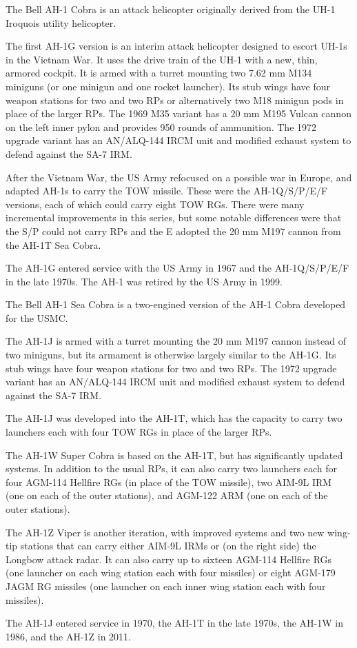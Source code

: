 

The Bell AH-1 Cobra is an attack helicopter originally derived from the UH-1 Iroquois utility helicopter.

The first AH-1G version is an interim attack helicopter designed to escort UH-1s in the Vietnam War. It uses the drive train of the UH-1 with a new, thin, armored cockpit. It is armed with a turret mounting two 7.62 mm M134 miniguns (or one minigun and one rocket launcher). Its stub wings have four weapon stations for two  and two  RPs or alternatively two M18 minigun pods in place of the larger RPs. The 1969 M35 variant has a 20 mm M195 Vulcan cannon on the left inner pylon and provides 950 rounds of ammunition. The 1972 upgrade variant has an AN/ALQ-144 IRCM unit and modified exhaust system to defend against the SA-7 IRM.

After the Vietnam War, the US Army refocused on a possible war in Europe, and adapted AH-1s to carry the TOW missile. These were the AH-1Q/S/P/E/F versions, each of which could carry eight TOW RGs. There were many incremental improvements in this series, but some notable differences were that the S/P could not carry RPs and the E adopted the 20 mm M197 cannon from the AH-1T Sea Cobra.

The AH-1G entered service with the US Army in 1967 and the AH-1Q/S/P/E/F in the late 1970s. The AH-1 was retired by the US Army in 1999.


The Bell AH-1 Sea Cobra is a two-engined version of the AH-1 Cobra developed for the USMC.

The AH-1J is armed with a turret mounting the 20 mm M197 cannon instead of two miniguns, but its armament is otherwise largely similar to the AH-1G. Its stub wings have four weapon stations for two  and two  RPs. The 1972 upgrade variant has an AN/ALQ-144 IRCM unit and modified exhaust system to defend against the SA-7 IRM.

The AH-1J was developed into the AH-1T, which has the capacity to carry two launchers each with four TOW RGs in place of the larger RPs.

The AH-1W Super Cobra is based on the AH-1T, but has significantly updated systems. In addition to the usual RPs, it can also carry two launchers each for four AGM-114 Hellfire RGs (in place of the TOW missile), two AIM-9L IRM (one on each of the outer stations), and AGM-122 ARM (one on each of the outer stations).

The AH-1Z Viper is another iteration, with improved systems and two new wing-tip stations that can carry either AIM-9L IRMs or (on the right side) the Longbow attack radar. It can also carry up to sixteen AGM-114 Hellfire RGs (one launcher on each wing station each with four missiles) or eight AGM-179 JAGM RG missiles (one launcher on each inner wing station each with four missiles).

The AH-1J entered service in 1970, the AH-1T in the late 1970s, the AH-1W in 1986, and the AH-1Z in 2011.